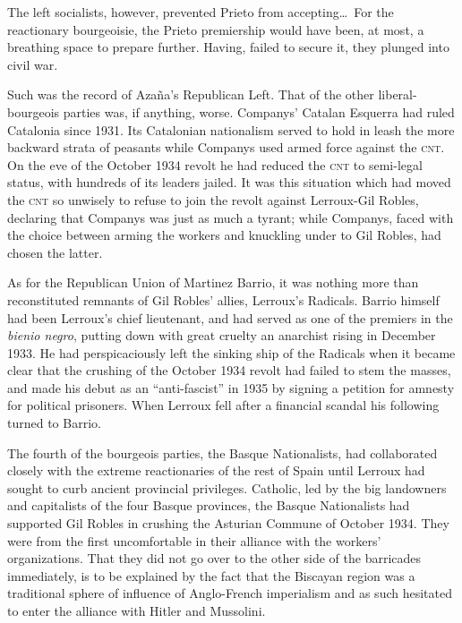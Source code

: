 The left socialists, however, prevented Prieto from accepting\ldots\ For the reactionary bourgeoisie, the Prieto premiership would have been, at most, a breathing space to prepare further. Having, failed to secure it, they plunged into civil war.

Such was the record of Azaña’s Republican Left. That of the other liberal-bourgeois parties was, if anything, worse. Companys’ Catalan Esquerra had ruled Catalonia since 1931. Its Catalonian nationalism served to hold in leash the more backward strata of peasants while Companys used armed force against the \textsc{cnt}. On the eve of the October 1934 revolt he had reduced the \textsc{cnt} to semi-legal status, with hundreds of its leaders jailed. It was this situation which had moved the \textsc{cnt} so unwisely to refuse to join the revolt against Lerroux-Gil Robles, declaring that Companys was just as much a tyrant; while Companys, faced with the choice between arming the workers and knuckling under to Gil Robles, had chosen the latter.

As for the Republican Union of Martinez Barrio, it was nothing more than reconstituted remnants of Gil Robles’ allies, Lerroux’s Radicals. Barrio himself had been Lerroux’s chief lieutenant, and had served as one of the premiers in the \emph{bienio negro}, putting down with great cruelty an anarchist rising in December 1933. He had perspicaciously left the sinking ship of the Radicals when it became clear that the crushing of the October 1934 revolt had failed to stem the masses, and made his debut as an ``anti-fascist'' in 1935 by signing a petition for amnesty for political prisoners. When Lerroux fell after a financial scandal his following turned to Barrio.

The fourth of the bourgeois parties, the Basque Nationalists, had collaborated closely with the extreme reactionaries of the rest of Spain until Lerroux had sought to curb ancient provincial privileges. Catholic, led by the big landowners and capitalists of the four Basque provinces, the Basque Nationalists had supported Gil Robles in crushing the Asturian Commune of October 1934. They were from the first uncomfortable in their alliance with the workers’ organizations. That they did not go over to the other side of the barricades immediately, is to be explained by the fact that the Biscayan region was a traditional sphere of influence of Anglo-French imperialism and as such hesitated to enter the alliance with Hitler and Mussolini.
\noclub

